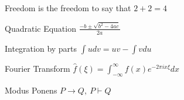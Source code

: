 Freedom is the freedom to say that $2+2=4$

Quadratic Equation $\frac{-b \pm \sqrt{b^2-4ac}}{2a}$

Integration by parts $\int udv = uv - \int vdu$

Fourier Transform $\hat{f}(\xi)=\int_{-\infty}^{\infty} f(x) e^{-2\pi i x \xi} dx$

Modus Ponens $P \rightarrow Q, \ P \vdash Q$